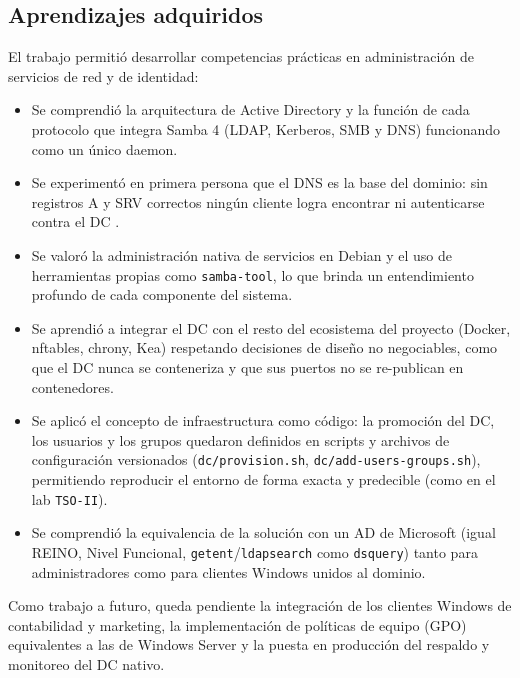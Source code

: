 \subsection{Aprendizajes adquiridos}

El trabajo permitió desarrollar competencias prácticas en administración de
servicios de red y de identidad:

\begin{itemize}
  \item Se comprendió la arquitectura de Active Directory y la función de cada
        protocolo que integra Samba 4 (LDAP, Kerberos, SMB y DNS) funcionando
        como un único daemon.
  \item Se experimentó en primera persona que el DNS es la base del dominio:
        sin registros A y SRV correctos ningún cliente logra encontrar ni
        autenticarse contra el DC \citep{rfc1035}.
  \item Se valoró la administración nativa de servicios en Debian y el uso de
        herramientas propias como \texttt{samba-tool}, lo que brinda un
        entendimiento profundo de cada componente del sistema.
  \item Se aprendió a integrar el DC con el resto del ecosistema del
        proyecto (Docker, nftables, chrony, Kea) respetando decisiones de
        diseño no negociables, como que el DC nunca se conteneriza y que sus
        puertos no se re-publican en contenedores.
  \item Se aplicó el concepto de infraestructura como código: la promoción
        del DC, los usuarios y los grupos quedaron definidos en scripts y
        archivos de configuración versionados (\texttt{dc/provision.sh},
        \texttt{dc/add-users-groups.sh}), permitiendo reproducir el entorno de
        forma exacta y predecible (como en el lab \texttt{TSO-II}).
  \item Se comprendió la equivalencia de la solución con un AD de Microsoft
        (igual REINO, Nivel Funcional, \texttt{getent}/\texttt{ldapsearch}
        como \texttt{dsquery}) tanto para administradores como para clientes
        Windows unidos al dominio.
\end{itemize}

Como trabajo a futuro, queda pendiente la integración de los clientes
Windows de contabilidad y marketing, la implementación de políticas de equipo
(GPO) equivalentes a las de Windows Server y la puesta en producción del
respaldo y monitoreo del DC nativo.